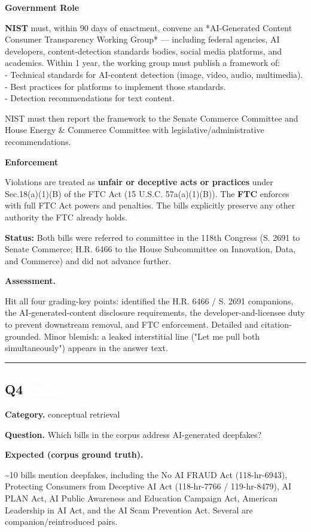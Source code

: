 \documentclass[11pt]{article}
\newcommand{\fieldlabel}[1]{\textbf{\color{navy}#1}\quad}
\begin{document}
\textbf{Government Role}

\textbf{NIST} must, within 90 days of enactment, convene an *AI-Generated Content Consumer Transparency Working Group* --- including federal agencies, AI developers, content-detection standards bodies, social media platforms, and academics. Within 1 year, the working group must publish a framework of: \\
- Technical standards for AI-content detection (image, video, audio, multimedia). \\
- Best practices for platforms to implement those standards. \\
- Detection recommendations for text content.

NIST must then report the framework to the Senate Commerce Committee and House Energy \& Commerce Committee with legislative/administrative recommendations.

\textbf{Enforcement}

Violations are treated as \textbf{unfair or deceptive acts or practices} under Sec.18(a)(1)(B) of the FTC Act (15 U.S.C. 57a(a)(1)(B)). The \textbf{FTC} enforces with full FTC Act powers and penalties. The bills explicitly preserve any other authority the FTC already holds.

\textbf{Status:} Both bills were referred to committee in the 118th Congress (S. 2691 to Senate Commerce; H.R. 6466 to the House Subcommittee on Innovation, Data, and Commerce) and did not advance further.

\fieldlabel{Assessment.} \colorbox{passgreen}{\textcolor{white}{\bfseries PASS}}\par
Hit all four grading-key points: identified the H.R. 6466 / S. 2691 companions, the AI-generated-content disclosure requirements, the developer-and-licensee duty to prevent downstream removal, and FTC enforcement. Detailed and citation-grounded. Minor blemish: a leaked interstitial line ("Let me pull both simultaneously") appears in the answer text.
\vspace{4pt}\hrule\vspace{8pt}
\subsection*{Q4 \quad \colorbox{passgreen}{\textcolor{white}{\bfseries PASS}}}
\fieldlabel{Category.} conceptual retrieval\par
\fieldlabel{Question.} Which bills in the corpus address AI-generated deepfakes?\par
\fieldlabel{Expected (corpus ground truth).}\par
\textasciitilde{}10 bills mention deepfakes, including the No AI FRAUD Act (118-hr-6943), Protecting Consumers from Deceptive AI Act (118-hr-7766 / 119-hr-8479), AI PLAN Act, AI Public Awareness and Education Campaign Act, American Leadership in AI Act, and the AI Scam Prevention Act. Several are companion/reintroduced pairs.
\end{document}
